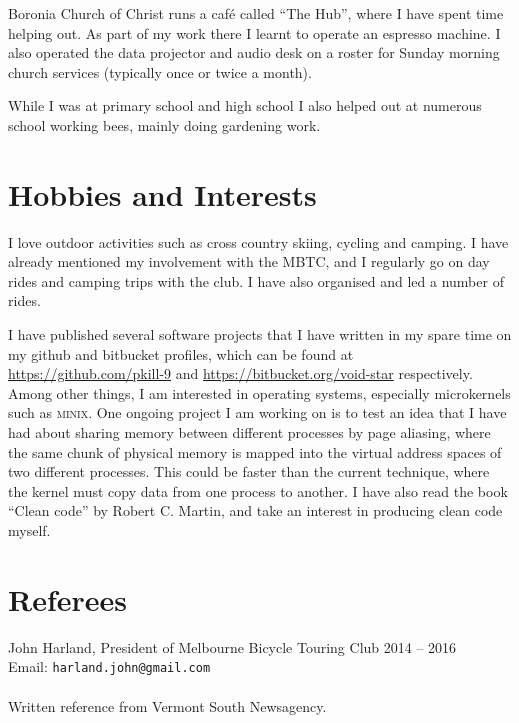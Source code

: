 \documentclass[a4paper]{article}
\begin{document}
Boronia Church of Christ runs a caf\'e called ``The Hub'', where I have
spent time helping out. As part of my work there I learnt to
operate an espresso machine. I 
also operated the data projector and audio desk on a roster for Sunday 
morning church services (typically once or twice a month).

While I was at primary school and high school I also helped out at
numerous school working bees, mainly doing gardening work.


\section{Hobbies and Interests}
I love outdoor activities such as cross country skiing, cycling
and camping. I have already mentioned my involvement with the MBTC, and I
regularly go on day rides and camping trips with the club. I have
also organised and led a number of rides.

I have published several software projects that I have written in my
spare time on my github and bitbucket profiles, which can be found at
\url{https://github.com/pkill-9} and \url{https://bitbucket.org/void-star}
respectively. Among other things, I am interested in operating systems,
especially microkernels such as \textsc{minix}. One ongoing project I am
working on is to test an idea that I have had about sharing memory between
different processes by page aliasing, where the same chunk of physical 
memory is mapped into the virtual address spaces of two different processes.
This could be faster than the current technique, where the kernel must
copy data from one process to another.
I have also read the book
``Clean code'' by Robert C. Martin, and take an interest in producing clean
code myself.




\section{Referees}
John Harland, President of Melbourne Bicycle Touring Club 2014 -- 2016\\
Email: \texttt{harland.john@gmail.com}\\ \\
Written reference from Vermont South Newsagency.
\end{document}
